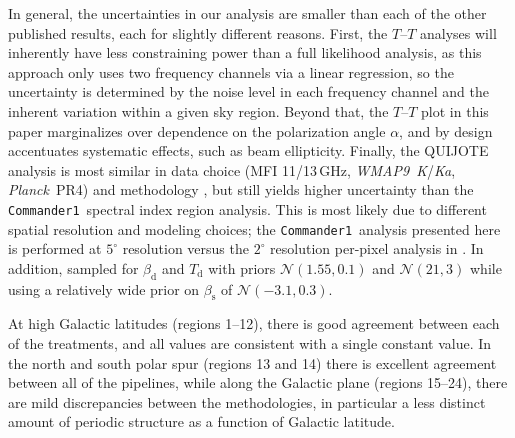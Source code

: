 \documentclass[twocolumn]{../../common/aa}
\def\WMAPnine{\emph{WMAP9}}
\def\Planck{\emph{Planck}}
\def\commanderone{\texttt{Commander1}}
\newcommand{\K}[0]{\textit K}
\newcommand{\Ka}[0]{\textit{Ka}}
\begin{document}
In general, the uncertainties in our analysis are smaller than each of the other published results, each for slightly different reasons. First, the $T$--$T$ analyses will inherently have less constraining power than a full likelihood analysis, as this approach only uses two frequency channels via a linear regression, so the uncertainty is determined by the noise level in each frequency channel and the inherent variation within a given sky region. Beyond that, the $T$--$T$ plot in this paper marginalizes over dependence on the polarization angle $\alpha$, and by design accentuates systematic effects, such as beam ellipticity. Finally, the QUIJOTE analysis is most similar in data choice (MFI 11/13\,GHz, \WMAPnine\ \K/\Ka, \Planck\ PR4) and methodology \citep[\texttt{B-SeCRET};][]{b-secret}, but still yields higher uncertainty than the \commanderone\ spectral index region analysis. This is most likely due to different spatial resolution and modeling choices; the \commanderone\ analysis presented here is performed at $5^\circ$ resolution versus the $2^\circ$ resolution per-pixel analysis in \citet{QUIJOTE_VIII}. In addition, \citet{QUIJOTE_VIII} sampled for $\beta_\mathrm d$ and $T_\mathrm{d}$ with priors $\mathcal N(1.55,0.1)$ and $\mathcal N(21,3)$ while using a relatively wide prior on $\beta_\mathrm s$ of $\mathcal N(-3.1, 0.3)$.

At high Galactic latitudes (regions 1--12), there is good agreement between each of the treatments, and all values are consistent with a single constant value. 
In the north and south polar spur (regions 13 and 14) there is excellent agreement between all of the pipelines, while along  the Galactic plane (regions 15--24), there are mild discrepancies between the methodologies, in particular a less distinct amount of periodic structure as a function of Galactic latitude.
\end{document}
